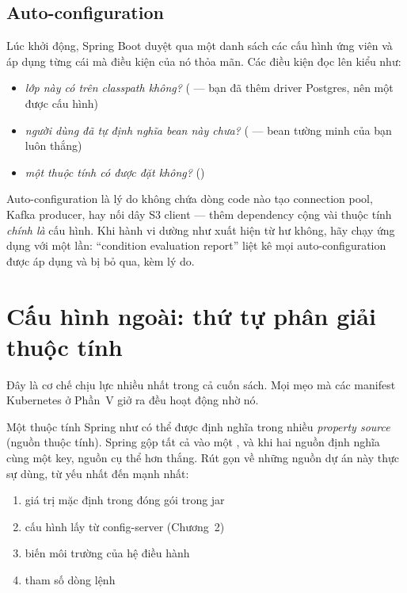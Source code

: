 \subsection{Auto-configuration}

Lúc khởi động, Spring Boot duyệt qua một danh sách các cấu hình ứng viên
và áp dụng từng cái mà điều kiện của nó thỏa mãn. Các điều kiện đọc lên
kiểu như:

\begin{itemize}
  \item \emph{lớp này có trên classpath không?} (
  --- bạn đã thêm driver Postgres, nên một  được cấu hình)
  \item \emph{người dùng đã tự định nghĩa bean này chưa?}
  ( --- bean tường minh của bạn luôn thắng)
  \item \emph{một thuộc tính có được đặt không?} ()
\end{itemize}

Auto-configuration là lý do  không chứa dòng code nào
tạo connection pool, Kafka producer, hay nối dây S3 client --- thêm
dependency cộng vài thuộc tính \emph{chính là} cấu hình. Khi hành vi
dường như xuất hiện từ hư không, hãy chạy ứng dụng với  một
lần: ``condition evaluation report'' liệt kê mọi auto-configuration được
áp dụng và bị bỏ qua, kèm lý do.

\section{Cấu hình ngoài: thứ tự phân giải thuộc tính}
\label{sec:property-order}

Đây là cơ chế chịu lực nhiều nhất trong cả cuốn sách. Mọi mẹo mà các
manifest Kubernetes ở Phần~V giở ra đều hoạt động nhờ nó.

Một thuộc tính Spring như  có thể được định
nghĩa trong nhiều \emph{property source} (nguồn thuộc tính). Spring gộp
tất cả vào một , và khi hai nguồn định nghĩa cùng một
key, nguồn cụ thể hơn thắng. Rút gọn về những nguồn dự án này thực sự
dùng, từ yếu nhất đến mạnh nhất:

\begin{enumerate}
  \item giá trị mặc định trong  đóng gói trong jar
  \item cấu hình lấy từ config-server (Chương~2)
  \item biến môi trường của hệ điều hành
  \item tham số dòng lệnh
\end{enumerate}


